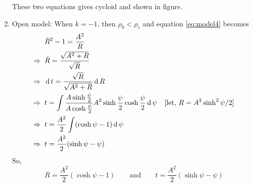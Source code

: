 \documentclass[../main-sheet.tex]{subfiles}
\begin{document}
\begin{soln}
\begin{enumerate}[label=(\roman*)]
    These two equations gives cycloid and shown in figure.
    \item Open model: When \(k=-1\), then \(\rho_0<\rho_c \) and equation \eqref{eq:model4} becomes
    \begin{align*}
        &\dot{R}^2-1=\frac{A^2}{R }\\
        \Rightarrow\;\;&\dot{R}=\frac{\sqrt{A^2+R}}{\sqrt{R} }\\
        \Rightarrow\;\;&\,\mathrm{d}\, t=\frac{\sqrt{R} }{\sqrt{A^2+R}}\,\mathrm{d}\, R \\
        \Rightarrow\;\;&t=\int \frac{A \sinh \frac{\psi}{2}}{A \cosh \frac{\psi}{2}}A^2\sinh \frac{\psi}{2}\cosh\frac{\psi}{2} \,\mathrm{d}\, \psi\quad[\text{let, }R=A^2\sinh^2\psi/2]\\
        \Rightarrow\;\;&t=\frac{A^2}{2}\int (\cosh \psi-1)\,\mathrm{d}\, \psi\\
        \Rightarrow\;\;&t=\frac{A^2}{2}(\sinh \psi- \psi)
    \end{align*}
    So,
    \[R=\frac{A^2}{2}(\cosh \psi-1)\qquad\text{and}\qquad t=\frac{A^2}{2}(\sinh \psi-\psi)\]
\end{enumerate}
\end{soln}
\end{document}
